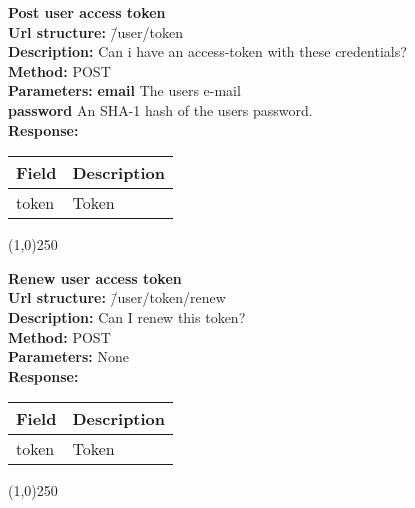 \documentclass[11pt]{article}
\begin{document}
\begin{tabbing}
\textbf{Post user access token} \\
\textcolor{black!60}{\textbf{Url structure:}} \hspace{0.2in} \= /user/token \\
\textcolor{black!60}{\textbf{Description:}}  \> Can i have an access-token with these credentials? \\
\textcolor{black!60}{\textbf{Method:}} \> POST \\
\textcolor{black!60}{\textbf{Parameters:}} \> \textbf{email} The users e-mail \\
\> \textbf{password} An SHA-1 hash of the users password. \\
\textcolor{black!60}{\textbf{Response:}} \\ \>
\begin{tabular}{|l|l|}
\hline
 Field  &  Description  \\
\hline
 token  &  Token        \\
\hline
\end{tabular}
\end{tabbing}

\begin{center}\line(1,0){250}\end{center}

\begin{tabbing}
\textbf{Renew user access token} \\
\textcolor{black!60}{\textbf{Url structure:}} \hspace{0.2in} \= /user/token/renew \\
\textcolor{black!60}{\textbf{Description:}}  \> Can I renew this token? \\
\textcolor{black!60}{\textbf{Method:}} \> POST \\
\textcolor{black!60}{\textbf{Parameters:}} \> None \\
\textcolor{black!60}{\textbf{Response:}} \\ \>
\begin{tabular}{|l|l|}
\hline
 Field  &  Description  \\
\hline
 token  &  Token        \\
\hline
\end{tabular}
\end{tabbing}

\begin{center}\line(1,0){250}\end{center}
\end{document}

